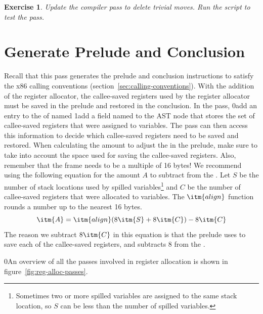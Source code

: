\documentclass[7x10]{TimesAPriori_MIT}%
\def\racketEd{0}
\def\pythonEd{1}
\providecommand{\BookEdition}{1}
\let\edition\BookEdition
\newcommand{\racket}[1]{{\if\edition\racketEd{#1}\fi}}
\newcommand{\pythonColor}[0]{}
\newcommand{\python}[1]{{\if\edition\pythonEd\pythonColor #1\fi}}
\newtheorem{exercise}[theorem]{Exercise}
\numberwithin{theorem}{chapter}
\numberwithin{definition}{chapter}
\numberwithin{equation}{chapter}
\begin{document}
\begin{exercise}\normalfont\normalsize
%
Update the  compiler pass to delete trivial moves.
%
%
Run the script to test the  pass.
\end{exercise}


\section{Generate Prelude and Conclusion}
\label{sec:print-x86-reg-alloc}

Recall that this pass generates the prelude and conclusion
instructions to satisfy the x86 calling conventions
(section~\ref{sec:calling-conventions}). With the addition of the
register allocator, the callee-saved registers used by the register
allocator must be saved in the prelude and restored in the conclusion.
In the  pass,
%
\racket{add an entry to the 
  of  named }
%
\python{add a field named \code{used\_callee} to the \code{X86Program} AST node}
%
that stores the set of callee-saved registers that were assigned to
variables. The  pass can then access
this information to decide which callee-saved registers need to be
saved and restored.
%
When calculating the amount to adjust the  in the prelude,
make sure to take into account the space used for saving the
callee-saved registers. Also, remember that the frame needs to be a
multiple of 16 bytes! We recommend using the following equation for
the amount $A$ to subtract from the . Let $S$ be the number
of stack locations used by spilled variables\footnote{Sometimes two or
  more spilled variables are assigned to the same stack location, so
  $S$ can be less than the number of spilled variables.} and $C$ be
the number of callee-saved registers that were
allocated to
variables. The $\itm{align}$ function rounds a number up to the
nearest 16 bytes.
\[
   \itm{A} = \itm{align}(8\itm{S} + 8\itm{C}) - 8\itm{C}
\]
The reason we subtract $8\itm{C}$ in this equation is that the
prelude uses  to save each of the callee-saved registers,
and  subtracts $8$ from the .

\racket{An overview of all the passes involved in register
  allocation is shown in figure~\ref{fig:reg-alloc-passes}.}
\end{document}
